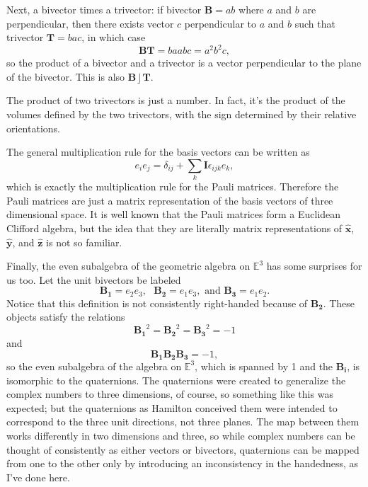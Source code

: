 \documentclass{utarticle}
\newcommand{\bl}[1]{\ensuremath{\bm{#1}}}
\newcommand{\I}{\bl{I}}
\DeclareMathOperator{\lin}{\rfloor}
\begin{document}
Next, a bivector times a trivector: if bivector $\bl{B}=ab$ where $a$ and $b$ are
perpendicular, then there exists vector $c$ perpendicular to $a$ and
$b$ such that trivector $\bl{T}=bac$, in which case
\begin{equation} \bl{B}\bl{T} = b a a b c = a^2 b^2 c, \end{equation}
so the product of a bivector and a trivector is a vector perpendicular
to the plane of the bivector.  This is also $\bl{B} \lin \bl{T}$.

The product of two trivectors is just a number. In fact, it's the product of 
the volumes defined by the two trivectors, with the sign determined 
by their relative orientations.

The general multiplication rule for the basis vectors can be written
as
\begin{equation} e_i e_j = \delta_{ij} + \sum_k \I \epsilon_{ijk} e_k, \end{equation} 
which is exactly the multiplication rule for the Pauli matrices.
Therefore the Pauli matrices are just a matrix representation of the
basis vectors of three dimensional space.  It is well known that the
Pauli matrices form a Euclidean Clifford algebra, but the idea that
they are literally matrix representations of $\bm{\hat{x}}$, $\bm{\hat{y}}$, 
and $\bm{\hat{z}}$ is not so familiar.

Finally, the even subalgebra of the geometric algebra on
$\mathbb{E}^3$ has some surprises for us too.  Let the unit bivectors
be labeled
\begin{equation} 
\bl{B_1} = e_2 e_3, \text{ } \bl{B_2} = e_1 e_3, \text{ and } \bl{B_3} = e_1 e_2.
\end{equation}
Notice that this definition is not consistently right-handed because
of \bl{B_2}.  These objects satisfy the relations
\begin{equation} \bl{B_1}^2 = \bl{B_2}^2 = \bl{B_3}^2 = -1 \end{equation}
and
\begin{equation} \bl{B_1} \bl{B_2} \bl{B_3} = -1, \end{equation}
so the even subalgebra of the algebra on $\mathbb{E}^3$, which is
spanned by 1 and the \bl{B_i}, is isomorphic to the quaternions.  The 
quaternions were created to generalize the complex numbers to three
dimensions, of course, so something like this was expected; but the 
quaternions as Hamilton conceived them were intended to correspond 
to the three unit directions, not three planes.  The map between them 
works differently in two dimensions and three, so while complex numbers
can be thought of consistently as either vectors or bivectors, quaternions
can be mapped from one to the other only by introducing an inconsistency
in the handedness, as I've done here.
\end{document}
